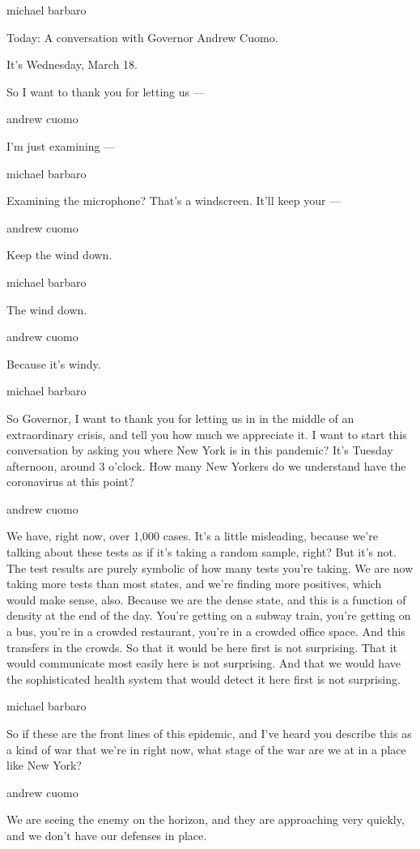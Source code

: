michael barbaro

Today: A conversation with Governor Andrew Cuomo.

It's Wednesday, March 18.

So I want to thank you for letting us ---

andrew cuomo

I'm just examining ---

michael barbaro

Examining the microphone? That's a windscreen. It'll keep your ---

andrew cuomo

Keep the wind down.

michael barbaro

The wind down.

andrew cuomo

Because it's windy.

michael barbaro

So Governor, I want to thank you for letting us in in the middle of an
extraordinary crisis, and tell you how much we appreciate it. I want to
start this conversation by asking you where New York is in this
pandemic? It's Tuesday afternoon, around 3 o'clock. How many New Yorkers
do we understand have the coronavirus at this point?

andrew cuomo

We have, right now, over 1,000 cases. It's a little misleading, because
we're talking about these tests as if it's taking a random sample,
right? But it's not. The test results are purely symbolic of how many
tests you're taking. We are now taking more tests than most states, and
we're finding more positives, which would make sense, also. Because we
are the dense state, and this is a function of density at the end of the
day. You're getting on a subway train, you're getting on a bus, you're
in a crowded restaurant, you're in a crowded office space. And this
transfers in the crowds. So that it would be here first is not
surprising. That it would communicate most easily here is not
surprising. And that we would have the sophisticated health system that
would detect it here first is not surprising.

michael barbaro

So if these are the front lines of this epidemic, and I've heard you
describe this as a kind of war that we're in right now, what stage of
the war are we at in a place like New York?

andrew cuomo

We are seeing the enemy on the horizon, and they are approaching very
quickly, and we don't have our defenses in place.

